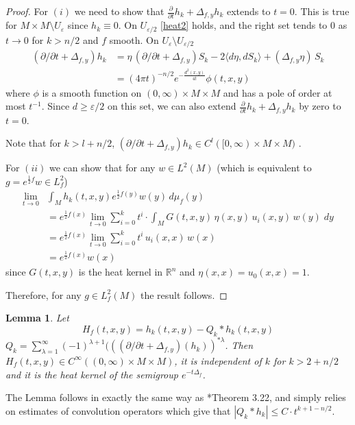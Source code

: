\documentclass[letterpaper,12pt]{amsart}
\newtheorem{lem}[thm]{Lemma}
\newcommand{\eps}{\varepsilon}
\def \p{\partial}
\def \eref{\eqref}
\begin{document}
\begin{proof}
For $(i)$ we need to show that $\frac{\p}{\p t} h_k +\Delta_{f,y}  h_k$ extends to $t=0$. This is true for $M\times M \setminus U_\eps$ since $h_k\equiv0$. On $U_{\eps/2}$ \eref{heat2} holds, and the right set tends to $0$ as $t\to 0$ for $k>n/2$ and $f$ smooth. On $ U_{\eps} \setminus U_{\eps/2}$
\begin{equation*}
\begin{split}
\left(  \p /\p t  +\Delta_{f,y}  \right) h_k  & =  \eta \, \left(  \p /\p t  +\Delta_{f,y}  \right) S_k -2  \langle d\eta, d S_k \rangle + (\Delta_{f,y} \eta) \, S_k\\
& = (4\pi t)^{-n/2} e^{-\frac{d^2(x,y)}{4t}} \phi(t,x,y)
\end{split}
\end{equation*}
where $\phi$ is a smooth function on $(0,\infty) \times M \times M$ and has a pole of order at most $t^{-1}$. Since $d\geq \eps/2$ on this set, we can also extend $\frac{\p}{\p t} h_k +\Delta_{f,y}  h_k$ by zero to $t=0$.

Note that for $k>l+n/2$,  $\left(  \p /\p t  +\Delta_{f,y}  \right) h_k \in C^l([0,\infty)\times M \times M)$ .


For $(ii)$ we can show that for any $w\in L^2(M)$ (which is equivalent to $g=e^{\frac 12 f} w \in L^2_f$)
\begin{equation*}
\begin{split}
\lim_{t \to 0} & \int_M  h_k(t,x,y) e^{\frac 12 f(y)} w(y)  \,  d\mu_f (y) \\
& = e^{\frac 12 f(x)} \lim_{t \to 0} \sum_{i=0}^k t^i \cdot  \int_M G(t,x,y) \, \eta(x,y) \,  u_i(x,y) \, w(y) \; dy \\
& =  e^{\frac 12 f(x)} \lim_{t \to 0} \sum_{i=0}^k t^i  \,  u_i(x,x) \, w(x)  \\
&= e^{\frac 12 f(x)} w(x)
\end{split}
\end{equation*}
since $ G(t,x,y)$ is the heat kernel in $\mathbb{R}^n$ and $\eta(x,x) = u_0(x,x)=1$.

Therefore, for any $g\in L^2_f(M)$ the result follows.
\end{proof}

\begin{lem}
Let
\[
H_f(t,x,y)= h_k(t,x,y) - Q_k * h_k(t,x,y)
\]
$Q_k = \sum_{\lambda =1}^\infty (-1)^{\lambda +1} (\left( (\p/\p t +\Delta_{f,y})(h_k)\right)^{*\lambda}$. Then $H_f(t,x,y) \in C^\infty((0,\infty)\times M \times M)$, it is independent of $k$ for $k> 2+ n/2$ and it is the heat kernel of the semigroup $e^{-t\Delta_f}$.
\end{lem}
The Lemma follows in exactly the same way as \cite{Ro}*{Theorem 3.22}, and simply relies on estimates of convolution operators which give that $|Q_k * h_k| \leq C\cdot t^{k+1-n/2}$.
\end{document}
